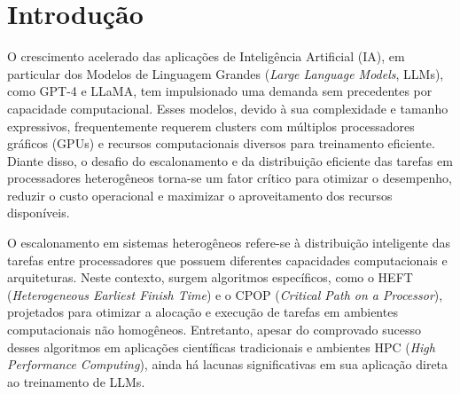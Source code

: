 \documentclass[12pt, %
openright, 
oneside, %
a4paper,    %
brazil]{facom-ufu-abntex2}
\begin{document}

\tableofcontents*
\cleardoublepage





\textual



\chapter[Introdução]{Introdução}
O crescimento acelerado das aplicações de Inteligência Artificial (IA), em particular dos Modelos de Linguagem Grandes (\textit{Large Language Models}, LLMs), como GPT-4 e LLaMA, tem impulsionado uma demanda sem precedentes por capacidade computacional. Esses modelos, devido à sua complexidade e tamanho expressivos, frequentemente requerem clusters com múltiplos processadores gráficos (GPUs) e recursos computacionais diversos para treinamento eficiente. Diante disso, o desafio do escalonamento e da distribuição eficiente das tarefas em processadores heterogêneos torna-se um fator crítico para otimizar o desempenho, reduzir o custo operacional e maximizar o aproveitamento dos recursos disponíveis.

O escalonamento em sistemas heterogêneos refere-se à distribuição inteligente das tarefas entre processadores que possuem diferentes capacidades computacionais e arquiteturas. Neste contexto, surgem algoritmos específicos, como o HEFT (\textit{Heterogeneous Earliest Finish Time}) e o CPOP (\textit{Critical Path on a Processor}), projetados para otimizar a alocação e execução de tarefas em ambientes computacionais não homogêneos. Entretanto, apesar do comprovado sucesso desses algoritmos em aplicações científicas tradicionais e ambientes HPC (\textit{High Performance Computing}), ainda há lacunas significativas em sua aplicação direta ao treinamento de LLMs.
\end{document}
